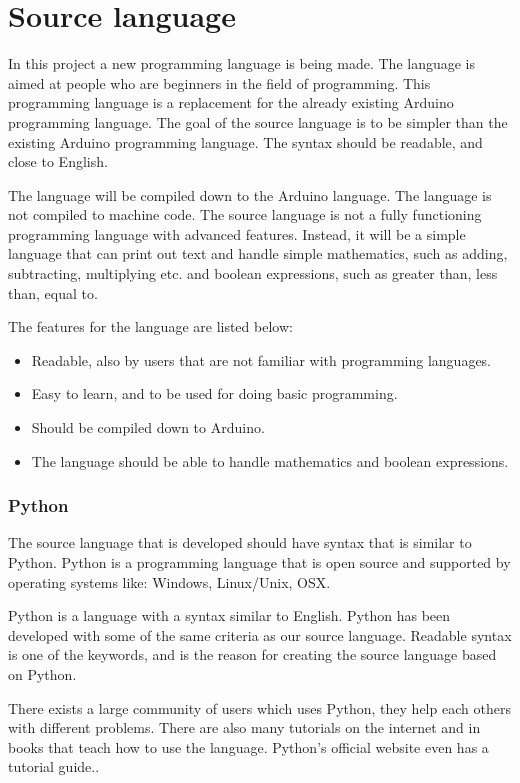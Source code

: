 \chapter{Source language}
In this project a new programming language is being made. The language is aimed at people who are beginners in the field of programming. This programming language is a replacement for the already existing Arduino programming language. 
The goal of the source language is to be simpler than the existing Arduino programming language. The syntax should be readable, and close to English.

The language will be compiled down to the Arduino language. The language is not compiled to machine code. The source language is not a fully functioning programming language with advanced features. Instead, it will be a simple language that can print out text and handle simple mathematics, such as adding, subtracting, multiplying etc. and boolean expressions, such as greater than, less than, equal to.

The features for the language are listed below:
\begin{itemize}
	\item Readable, also by users that are not familiar with programming languages.
	\item Easy to learn, and to be used for doing basic programming.
	\item Should be compiled down to Arduino.
	\item The language should be able to handle mathematics and boolean expressions.
\end{itemize}

\subsection{Python}
The source language that is developed should have syntax that is similar to Python. Python is a programming language that is open source and supported by operating systems like: Windows, Linux/Unix, OSX.

Python is a language with a syntax similar to English.
Python has been developed with some of the same criteria as our source language. Readable syntax is one of the keywords, and is the reason for creating the source language based on Python.
 
\cite{python:official:about}
There exists a large community of users which uses Python, they help each others with different problems. There are also many tutorials on the internet and in books that teach how to use the language. Python's official website even has a tutorial guide.\cite{python:official:tutorial}.